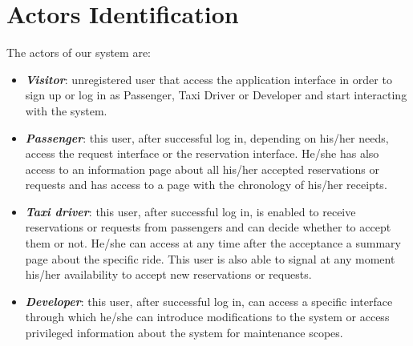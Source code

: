 \chapter{Actors Identification} \label{chap2}

The actors of our system are:
\begin{itemize}
	\item \textbf{\textit{Visitor}}: unregistered user that access the application interface in order to sign up or log in as Passenger, Taxi Driver or Developer and start interacting with the system.
	\item \textbf{\textit{Passenger}}: this user, after successful log in, depending on his/her needs, access the request interface or the reservation interface. He/she has also access to an information page about all his/her accepted reservations or requests and has access to a page with the chronology of his/her receipts.
	\item \textbf{\textit{Taxi driver}}: this user, after successful log in, is enabled to receive reservations or requests from passengers and can decide whether to accept them or not. He/she can access at any time after the acceptance a summary page about the specific ride. This user is also able to signal at any moment his/her availability to accept new reservations or requests.
	\item \textbf{\textit{Developer}}: this user, after successful log in, can access a specific interface through which he/she can introduce modifications to the system or access privileged information about the system for maintenance scopes.
\end{itemize}